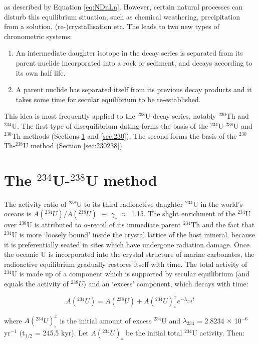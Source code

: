 \documentclass{book}
\begin{document}
as described by Equation \ref{eq:NDnLn}. However, certain natural
processes can disturb this equilibrium situation, such as chemical
weathering, precipitation from a solution, (re-)crystallisation
etc. The leads to two new types of chronometric systems:

\begin{enumerate}
\item An intermediate daughter isotope in the decay series is
  separated from its parent nuclide incorporated into a rock or
  sediment, and decays according to its own half life.
\item A parent nuclide has separated itself from its previous decay
  products and it takes some time for secular equilibrium to be
  re-established.
\end{enumerate}

This idea is most frequently applied to the $^{238}$U-decay series,
notably $^{230}$Th and $^{234}$U. The first type of disequilibrium
dating forms the basis of the $^{234}$U-$^{238}$U and $^{230}$Th
methods (Sections \ref{sec:234238} and \ref{sec:230}). The second
forms the basis of the $^{230}$Th-$^{238}$U method (Section
\ref{sec:230238})

\section{The $^{234}$U-$^{238}$U method}
\label{sec:234238}

The activity ratio of $^{238}$U to its third radioactive daughter
$^{234}$U in the world's oceans is $A(^{234}U)/A(^{238}U)$ $\equiv$
$\gamma_\circ$ $\approx$ 1.15. The slight enrichment of the $^{234}$U
over $^{238}$U is attributed to $\alpha$-recoil of its immediate
parent $^{234}$Th and the fact that $^{234}$U is more `loosely bound'
inside the crystal lattice of the host mineral, because it is
preferentially seated in sites which have undergone radiation
damage. Once the oceanic U is incorporated into the crystal structure
of marine carbonates, the radioactive equilibrium gradually restores
itself with time. The total activity of $^{234}$U is made up of a
component which is supported by secular equilibrium (and equals the
activity of $^{238}U$) and an `excess' component, which decays with
time:

\begin{equation}
A(^{234}U) = A(^{238}U) + A(^{234}U)^x_\circ e^{-\lambda_{234}t} 
\label{eq:A234}
\end{equation}

where $A(^{234}U)^x_\circ$ is the initial amount of excess $^{234}$U
and $\lambda_{234}$ = 2.8234 $\times$ 10$^{-6}$ yr$^{-1}$ (t$_{1/2}$ =
245.5 kyr). Let $A(^{234}U)_\circ$ be the initial total $^{234}$U
activity. Then:
\end{document}
